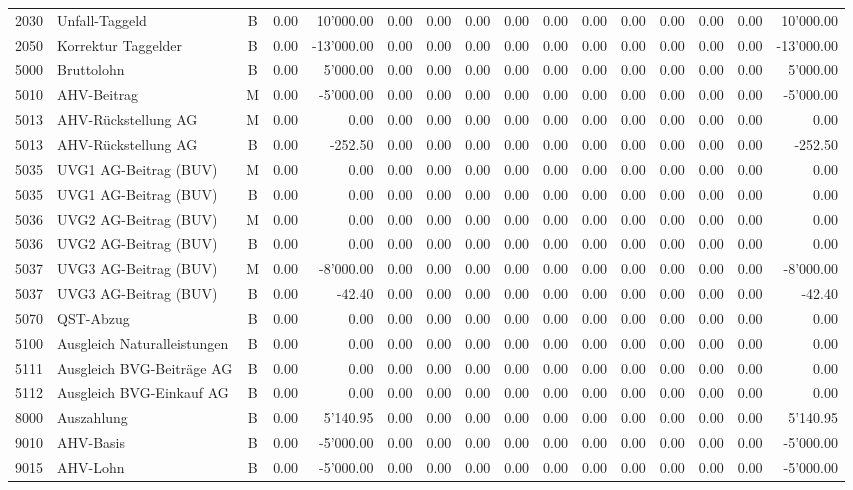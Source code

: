 \documentclass[8pt,a4paper]{extarticle}
\begin{document}
\begin{longtable}{@{\extracolsep{\fill}} l l c r r r r r r r r r r r r r}
2030&Unfall-Taggeld&B&0.00&10'000.00&0.00&0.00&0.00&0.00&0.00&0.00&0.00&0.00&0.00&0.00&10'000.00\\
2050&Korrektur Taggelder&B&0.00&-13'000.00&0.00&0.00&0.00&0.00&0.00&0.00&0.00&0.00&0.00&0.00&-13'000.00\\
5000&Bruttolohn&B&0.00&5'000.00&0.00&0.00&0.00&0.00&0.00&0.00&0.00&0.00&0.00&0.00&5'000.00\\
5010&AHV-Beitrag&M&0.00&-5'000.00&0.00&0.00&0.00&0.00&0.00&0.00&0.00&0.00&0.00&0.00&-5'000.00\\
5013&AHV-Rückstellung AG&M&0.00&0.00&0.00&0.00&0.00&0.00&0.00&0.00&0.00&0.00&0.00&0.00&0.00\\
5013&AHV-Rückstellung AG&B&0.00&-252.50&0.00&0.00&0.00&0.00&0.00&0.00&0.00&0.00&0.00&0.00&-252.50\\
5035&UVG1 AG-Beitrag (BUV)&M&0.00&0.00&0.00&0.00&0.00&0.00&0.00&0.00&0.00&0.00&0.00&0.00&0.00\\
5035&UVG1 AG-Beitrag (BUV)&B&0.00&0.00&0.00&0.00&0.00&0.00&0.00&0.00&0.00&0.00&0.00&0.00&0.00\\
5036&UVG2 AG-Beitrag (BUV)&M&0.00&0.00&0.00&0.00&0.00&0.00&0.00&0.00&0.00&0.00&0.00&0.00&0.00\\
5036&UVG2 AG-Beitrag (BUV)&B&0.00&0.00&0.00&0.00&0.00&0.00&0.00&0.00&0.00&0.00&0.00&0.00&0.00\\
5037&UVG3 AG-Beitrag (BUV)&M&0.00&-8'000.00&0.00&0.00&0.00&0.00&0.00&0.00&0.00&0.00&0.00&0.00&-8'000.00\\
5037&UVG3 AG-Beitrag (BUV)&B&0.00&-42.40&0.00&0.00&0.00&0.00&0.00&0.00&0.00&0.00&0.00&0.00&-42.40\\
5070&QST-Abzug&B&0.00&0.00&0.00&0.00&0.00&0.00&0.00&0.00&0.00&0.00&0.00&0.00&0.00\\
5100&Ausgleich Naturalleistungen&B&0.00&0.00&0.00&0.00&0.00&0.00&0.00&0.00&0.00&0.00&0.00&0.00&0.00\\
5111&Ausgleich BVG-Beiträge AG&B&0.00&0.00&0.00&0.00&0.00&0.00&0.00&0.00&0.00&0.00&0.00&0.00&0.00\\
5112&Ausgleich BVG-Einkauf AG&B&0.00&0.00&0.00&0.00&0.00&0.00&0.00&0.00&0.00&0.00&0.00&0.00&0.00\\
8000&Auszahlung&B&0.00&5'140.95&0.00&0.00&0.00&0.00&0.00&0.00&0.00&0.00&0.00&0.00&5'140.95\\
9010&AHV-Basis&B&0.00&-5'000.00&0.00&0.00&0.00&0.00&0.00&0.00&0.00&0.00&0.00&0.00&-5'000.00\\
9015&AHV-Lohn&B&0.00&-5'000.00&0.00&0.00&0.00&0.00&0.00&0.00&0.00&0.00&0.00&0.00&-5'000.00\\

\end{longtable}
\end{document}
